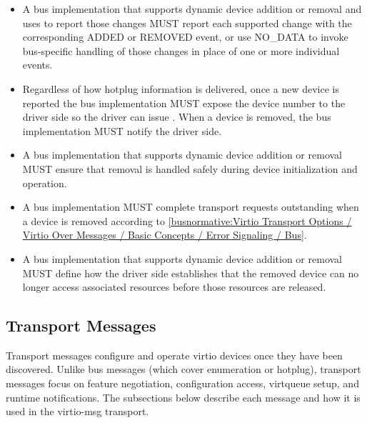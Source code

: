 \begin{itemize}
  \item A bus implementation that supports dynamic device addition or removal
        and uses  to report those changes MUST report each
        supported change with the corresponding ADDED or REMOVED event, or use
        NO\_DATA to invoke bus-specific handling of those changes in place of
        one or more individual events.
  \item Regardless of how hotplug information is delivered, once a new device is
        reported the bus implementation MUST expose the device number to the
        driver side so the driver can issue . When a
        device is removed, the bus implementation MUST notify the driver side.
  \item A bus implementation that supports dynamic device addition or removal
        MUST ensure that removal is handled safely during device initialization
        and operation.
  \item A bus implementation MUST complete transport requests outstanding when
        a device is removed according to
        \ref{busnormative:Virtio Transport Options / Virtio Over Messages / Basic Concepts / Error Signaling / Bus}.
  \item A bus implementation that supports dynamic device addition or removal
        MUST define how the driver side establishes that the removed device can
        no longer access associated resources before those resources are
        released.
\end{itemize}

\subsection{Transport Messages}\label{sec:Virtio Transport Options / Virtio Over Messages / Transport Messages}

Transport messages configure and operate virtio devices once they have been
discovered. Unlike bus messages (which cover enumeration or hotplug), transport
messages focus on feature negotiation, configuration access, virtqueue setup,
and runtime notifications. The subsections below describe each message and how
it is used in the virtio-msg transport.

